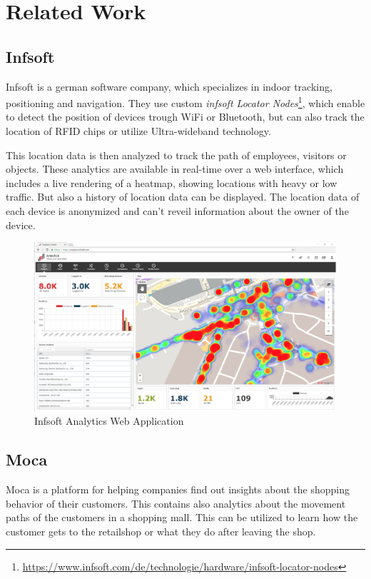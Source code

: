 \section{Related Work}

\subsection{Infsoft}

Infsoft is a german software company, which specializes in indoor tracking, positioning and navigation. They use custom \emph{infsoft Locator Nodes}\footnote{\url{https://www.infsoft.com/de/technologie/hardware/infsoft-locator-nodes}}, which enable to detect the position of devices trough WiFi or Bluetooth, but can also track the location of RFID chips or utilize Ultra-wideband technology.

This location data is then analyzed to track the path of employees, visitors or objects. These analytics are available in real-time over a web interface, which includes a live rendering of a heatmap, showing locations with heavy or low traffic. But also a history of location data can be displayed. The location data of each device is anonymized and can't reveil information about the owner of the device.

\begin{figure}[!hb]
	\centering
	\includegraphics[width=0.9\linewidth]{images/Infsoft}
	\caption{Infsoft Analytics Web Application}
	\label{fig:InfsoftApplication}
\end{figure}

\subsection{Moca}

Moca is a platform for helping companies find out insights about the shopping behavior of their customers. This contains also analytics about the movement paths of the customers in a shopping mall. 
This can be utilized to learn how the customer gets to the retailshop or what they do after leaving the shop.

